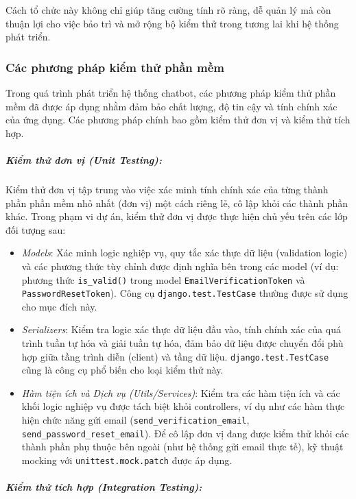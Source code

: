 Cách tổ chức này không chỉ giúp tăng cường tính rõ ràng, dễ quản lý mà còn thuận lợi cho việc bảo trì và mở rộng bộ kiểm thử trong tương lai khi hệ thống phát triển.

\subsubsection{Các phương pháp kiểm thử phần mềm}

Trong quá trình phát triển hệ thống chatbot, các phương pháp kiểm thử phần mềm đã được áp dụng nhằm đảm bảo chất lượng, độ tin cậy và tính chính xác của ứng dụng. Các phương pháp chính bao gồm kiểm thử đơn vị và kiểm thử tích hợp.

\subparagraph{Kiểm thử đơn vị (Unit Testing): }



Kiểm thử đơn vị tập trung vào việc xác minh tính chính xác của từng thành phần phần mềm nhỏ nhất (đơn vị) một cách riêng lẻ, cô lập khỏi các thành phần khác. Trong phạm vi dự án, kiểm thử đơn vị được thực hiện chủ yếu trên các lớp đối tượng sau:
\begin{itemize}
    \item \textit{Models}: Xác minh logic nghiệp vụ, quy tắc xác thực dữ liệu (validation logic) và các phương thức tùy chỉnh được định nghĩa bên trong các model (ví dụ: phương thức \texttt{is\_valid()} trong model \texttt{EmailVerificationToken} và \texttt{PasswordResetToken}). Công cụ \texttt{django.test.TestCase} thường được sử dụng cho mục đích này.
    \item \textit{Serializers}: Kiểm tra logic xác thực dữ liệu đầu vào, tính chính xác của quá trình tuần tự hóa và giải tuần tự hóa, đảm bảo dữ liệu được chuyển đổi phù hợp giữa tầng trình diễn (client) và tầng dữ liệu. \texttt{django.test.TestCase} cũng là công cụ phổ biến cho loại kiểm thử này.
    \item \textit{Hàm tiện ích và Dịch vụ (Utils/Services)}: Kiểm tra các hàm tiện ích và các khối logic nghiệp vụ được tách biệt khỏi controllers, ví dụ như các hàm thực hiện chức năng gửi email (\texttt{send\_verification\_email}, \texttt{send\_password\_reset\_email}). Để cô lập đơn vị đang được kiểm thử khỏi các thành phần phụ thuộc bên ngoài (như hệ thống gửi email thực tế), kỹ thuật mocking với \texttt{unittest.mock.patch} được áp dụng.
\end{itemize}

\subparagraph{Kiểm thử tích hợp (Integration Testing): }



